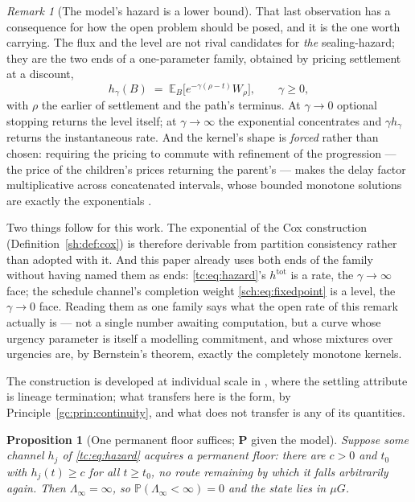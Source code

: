 \documentclass[11pt]{article}
\numberwithin{equation}{section}
\theoremstyle{plain}
\newtheorem{proposition}[theorem]{Proposition}
\theoremstyle{definition}
\theoremstyle{remark}
\newtheorem{remark}[theorem]{Remark}
\newcommand{\E}{\mathbb{E}}
\newcommand{\PP}{\mathbb{P}}
\begin{document}
\begin{remark}[The model's hazard is a lower bound]
That last observation has a consequence for how the open problem should
be posed, and it is the one worth carrying. The flux and the level are
not rival candidates for \emph{the} sealing-hazard; they are the two ends
of a one-parameter family, obtained by pricing settlement at a discount,
\begin{equation}\label{gc:eq:sealprice}
h_\gamma(B)\;=\;\E_B\bigl[e^{-\gamma(\rho-t)}W_\rho\bigr],
\qquad \gamma\ge0,
\end{equation}
with $\rho$ the earlier of settlement and the path's terminus. At
$\gamma\to0$ optional stopping returns the level itself; at
$\gamma\to\infty$ the exponential concentrates and $\gamma h_\gamma$
returns the instantaneous rate. And the kernel's shape is \emph{forced}
rather than chosen: requiring the pricing to commute with refinement of
the progression --- the price of the children's prices returning the
parent's --- makes the delay factor multiplicative across concatenated
intervals, whose bounded monotone solutions are exactly the exponentials
\cite{Aethus}.

Two things follow for this work. The exponential of the Cox construction
(Definition~\ref{sh:def:cox}) is therefore derivable from partition consistency
rather than adopted with it. And this paper already uses both ends of the
family without having named them as ends: \eqref{tc:eq:hazard}'s
$h^{\mathrm{tot}}$ is a rate, the $\gamma\to\infty$ face; the schedule
channel's completion weight \eqref{sch:eq:fixedpoint} is a level, the
$\gamma\to0$ face. Reading them as one family says what the open rate of
this remark actually is --- not a single number awaiting computation, but
a curve whose urgency parameter is itself a modelling commitment, and
whose mixtures over urgencies are, by Bernstein's theorem, exactly the
completely monotone kernels.

The construction is developed at individual scale in \cite{Aethus}, where
the settling attribute is lineage termination; what transfers here is the
form, by Principle~\ref{gc:prin:continuity}, and what does not transfer
is any of its quantities.
\end{remark}

\begin{proposition}[One permanent floor suffices; \textbf{P} given the
model]\label{gc:prop:onefloor}
Suppose some channel $h_j$ of \eqref{tc:eq:hazard} acquires a
\emph{permanent floor}: there are $c>0$ and $t_0$ with
$h_j(t)\ge c$ for all $t\ge t_0$, no route remaining by which it falls
arbitrarily again. Then $\Lambda_\infty=\infty$, so
$\PP(\Lambda_\infty<\infty)=0$ and the state lies in $\mu G$.
\end{proposition}
\end{document}
